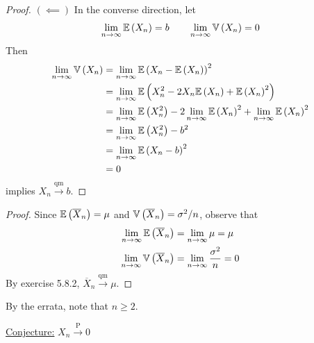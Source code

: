 \documentclass[a4paper]{article}
\begin{document}
\begin{proof}[Proof]
\(\left( \impliedby \right) \) In the converse direction, let
\[
	\lim_{n \to \infty} \mathbb{E}\left( X_{n} \right) = b \qquad \lim_{n \to \infty} \mathbb{V}\left( X_{n} \right) = 0
\]
Then 
\begin{align*}
	\lim_{n \to \infty} \mathbb{V}\left( X_{n} \right) & = \lim_{n \to \infty} \mathbb{E}\left( X_{n} - \mathbb{E}\left( X_{n} \right) \right)^{2}  \\
	& = \lim_{n \to \infty} \mathbb{E}\left( X^{2}_{n} - 2 X_{n} \mathbb{E}\left( X_{n} \right) + \mathbb{E}\left( X_{n} \right)^{2} \right) \\
	& = \lim_{n \to \infty} \mathbb{E}\left( X^{2}_{n} \right) - 2 \lim_{n \to \infty} \mathbb{E}\left( X_{n} \right)^{2} + \lim_{n \to \infty} \mathbb{E}\left( X_{n} \right)^{2} \\
	& = \lim_{n \to \infty} \mathbb{E}\left( X^{2}_{n} \right) - b^{2} \\
	& = \lim_{n \to \infty} \mathbb{E}\left( X_{n} - b \right)^{2} \\
	& = 0
\end{align*}
implies \(X_{n} \xrightarrow{\text{qm}} b\).
\end{proof}

\begin{proof}[Proof] 
Since \(\mathbb{E}\left( \overline{X}_{n} \right) = \mu \) and \(\mathbb{V}\left( \overline{X}_{n} \right) = \sigma^{2} / n\), observe that
\begin{align*}
	\lim_{n \to \infty} \mathbb{E}\left( \overline{X}_{n} \right) & = \lim_{n \to \infty} \mu = \mu  \\
	\lim_{n \to \infty} \mathbb{V}\left( \overline{X}_{n} \right) & = \lim_{n \to \infty} \frac{\sigma^{2}}{n} = 0 \\ 
\end{align*}
By exercise 5.8.2, \(\overline{X}_{n} \xrightarrow{\text{qm}} \mu \).
\end{proof}


By the errata, note that \(n \ge 2\).

\underline{Conjecture:} \(X_{n} \xrightarrow{\text{ P }} 0 \)
\end{document}
